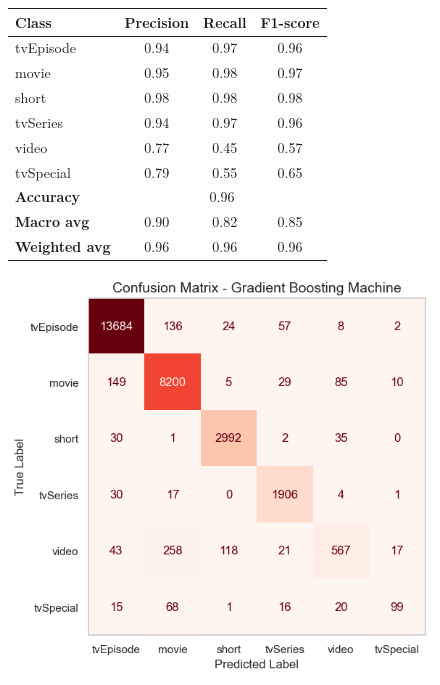 
\begin{figure}[ht]
    \centering
    \begin{minipage}{0.45\textwidth} 
    \centering
    \label{tab:GBM_report_t}
    \small 
    \begin{tabular}{lccc}
    \hline
    \textbf{Class} & \textbf{Precision} & \textbf{Recall} & \textbf{F1-score}\\
    \hline
    tvEpisode  & 0.94 & 0.97 & 0.96  \\
    movie      & 0.95 & 0.98 & 0.97  \\
    short      & 0.98 & 0.98 & 0.98  \\
    tvSeries   & 0.94 & 0.97 & 0.96  \\
    video      & 0.77 & 0.45 & 0.57  \\
    tvSpecial  & 0.79 & 0.55 & 0.65  \\
    \hline
    \textbf{Accuracy}    & \multicolumn{3}{c}{0.96} \\
    \textbf{Macro avg}   & 0.90 & 0.82 & 0.85  \\
    \textbf{Weighted avg}& 0.96 & 0.96 & 0.96  \\
    \hline
    \end{tabular}
    \end{minipage}
    \hfill
    \begin{minipage}{0.4\textwidth} 
    \centering
    \includegraphics[width=\textwidth]{plotsss/GBM_confusion_title.png} 

\end{minipage}
\end{figure}
